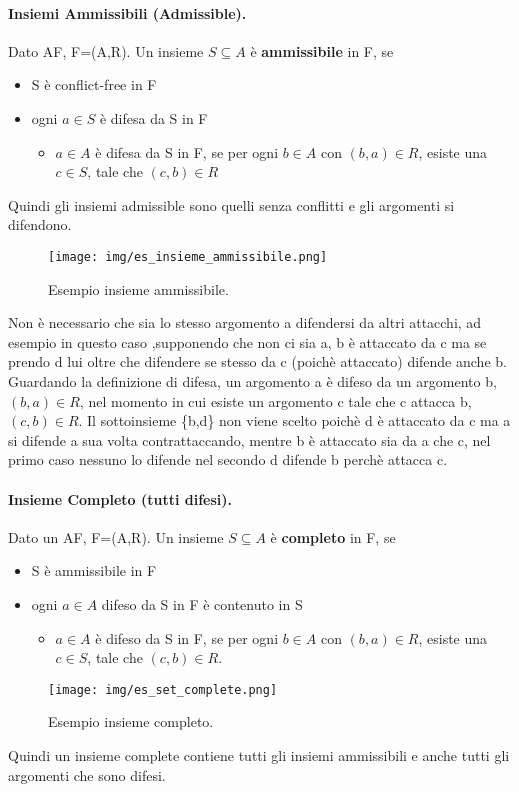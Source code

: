 \paragraph{Insiemi Ammissibili (Admissible).} Dato AF, F=(A,R). Un insieme $S \subseteq A$ è \textbf{ammissibile} in F, se 
\begin{itemize}
    \item S è conflict-free in F
    \item ogni $a\in S$ è difesa da S in F
    \begin{itemize}
        \item  $a\in A$ è difesa da S in F, se per ogni $b\in A$ con $(b,a) \in R$, esiste una $c\in S$, tale che $(c,b)\in R $
    \end{itemize}
\end{itemize}
Quindi gli insiemi admissible sono quelli senza conflitti e gli argomenti si difendono.
\begin{figure}[H]
    \centering
    \texttt{[image: img/es\_insieme\_ammissibile.png]}
    \caption{Esempio insieme ammissibile.}\label{fig:es_insieme_ammissibile}
\end{figure}
Non è necessario che sia lo stesso argomento a difendersi da altri attacchi, ad esempio in questo caso ,supponendo che non ci sia a, b è attaccato da c ma  se prendo d lui oltre che difendere se stesso da c (poichè attaccato) difende anche b. Guardando la definizione di difesa, un argomento a è difeso da un argomento b, $(b,a) \in R$, nel momento in cui esiste un argomento c tale che c attacca b, $(c,b) \in R$. Il sottoinsieme \{b,d\} non viene scelto poichè d è attaccato da c ma a si difende a sua volta contrattaccando, mentre b è attaccato sia da a che c, nel primo caso nessuno lo difende nel secondo d difende b perchè attacca c.

\paragraph{Insieme Completo (tutti difesi).} Dato un AF, F=(A,R). Un insieme $S \subseteq A$ è \textbf{completo} in F, se 
\begin{itemize}
    \item S è ammissibile in F
    \item ogni $a\in A$ difeso da S in F è contenuto in S
    \begin{itemize}
        \item $a\in A$ è difeso da S in F, se per ogni $b\in A$ con $(b,a) \in R$, esiste una $c\in S$, tale che $(c,b)\in R$.
    \end{itemize}
\end{itemize}
\begin{figure}[H]
    \centering
    \texttt{[image: img/es\_set\_complete.png]}
    \caption{Esempio insieme completo.}\label{fig:es_insieme_completo}
\end{figure}
Quindi un insieme complete contiene tutti gli insiemi ammissibili e anche tutti gli argomenti che sono difesi.

